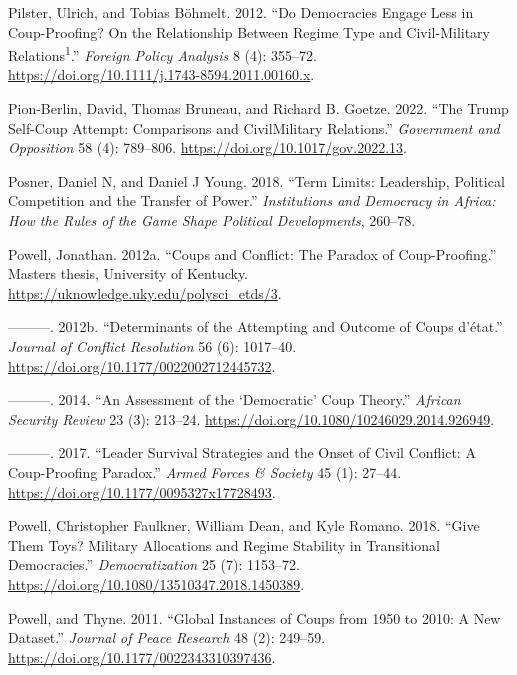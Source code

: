 \documentclass[
  12pt,
]{report}
\newlength{\cslhangindent}
\newenvironment{CSLReferences}[2] %
 {\begin{list}{}{%
  \setlength{\itemindent}{0pt}
  \setlength{\leftmargin}{0pt}
  \setlength{\parsep}{0pt}
  \ifodd #1
   \setlength{\leftmargin}{\cslhangindent}
   \setlength{\itemindent}{-1\cslhangindent}
  \fi
  \setlength{\itemsep}{#2\baselineskip}}}
 {\end{list}}
\begin{document}
\begin{CSLReferences}{1}{0}
Pilster, Ulrich, and Tobias Böhmelt. 2012. {``Do Democracies Engage Less
in Coup-Proofing? On the Relationship Between Regime Type and
Civil-Military Relations{\textsuperscript{1}}.''} \emph{Foreign Policy
Analysis} 8 (4): 355--72.
\url{https://doi.org/10.1111/j.1743-8594.2011.00160.x}.

Pion-Berlin, David, Thomas Bruneau, and Richard B. Goetze. 2022. {``The
Trump Self-Coup Attempt: Comparisons and Civil{\textendash}Military
Relations.''} \emph{Government and Opposition} 58 (4): 789--806.
\url{https://doi.org/10.1017/gov.2022.13}.

Posner, Daniel N, and Daniel J Young. 2018. {``Term Limits: Leadership,
Political Competition and the Transfer of Power.''} \emph{Institutions
and Democracy in Africa: How the Rules of the Game Shape Political
Developments}, 260--78.

Powell, Jonathan. 2012a. {``Coups and Conflict: The Paradox of
Coup-Proofing.''} Master\textquotesingle s thesis, University of
Kentucky. \url{https://uknowledge.uky.edu/polysci_etds/3}.

---------. 2012b. {``Determinants of the Attempting and Outcome of Coups
d{'}état.''} \emph{Journal of Conflict Resolution} 56 (6): 1017--40.
\url{https://doi.org/10.1177/0022002712445732}.

---------. 2014. {``An Assessment of the {`}Democratic{'} Coup
Theory.''} \emph{African Security Review} 23 (3): 213--24.
\url{https://doi.org/10.1080/10246029.2014.926949}.

---------. 2017. {``Leader Survival Strategies and the Onset of Civil
Conflict: A Coup-Proofing Paradox.''} \emph{Armed Forces \& Society} 45
(1): 27--44. \url{https://doi.org/10.1177/0095327x17728493}.

Powell, Christopher Faulkner, William Dean, and Kyle Romano. 2018.
{``Give Them Toys? Military Allocations and Regime Stability in
Transitional Democracies.''} \emph{Democratization} 25 (7): 1153--72.
\url{https://doi.org/10.1080/13510347.2018.1450389}.

Powell, and Thyne. 2011. {``Global Instances of Coups from 1950 to 2010:
A New Dataset.''} \emph{Journal of Peace Research} 48 (2): 249--59.
\url{https://doi.org/10.1177/0022343310397436}.


\end{CSLReferences}
\end{document}

